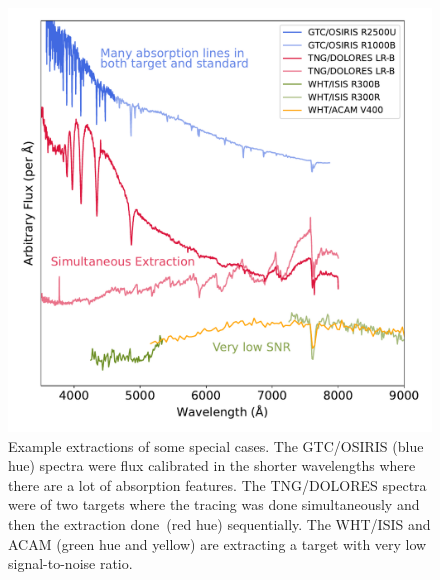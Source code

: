 \documentclass[twocolumn, linenumbers]{aastex631}
\begin{document}
\begin{figure}
    \centering
    \includegraphics[width=\textwidth]{fig_09_use_case_plots.pdf}
    \caption{Example extractions of some special cases. The GTC/OSIRIS (blue hue)
    spectra were flux calibrated in the shorter wavelengths where there are a lot
    of absorption features. The TNG/DOLORES spectra were of two targets where the
    tracing was done simultaneously and then the extraction done~(red hue)
    sequentially. The WHT/ISIS and ACAM (green hue and yellow) are extracting a
    target with very low signal-to-noise ratio.}
    \label{fig:use_cases}
\end{figure}

\end{document}
